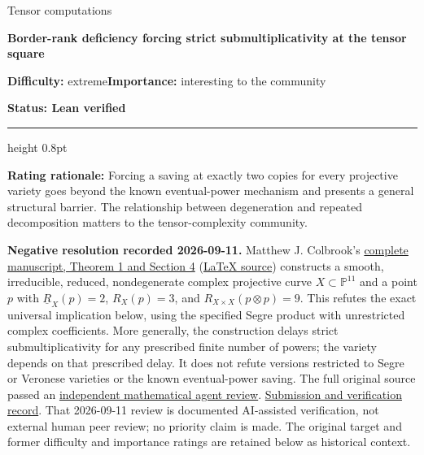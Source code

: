 \documentclass[11pt,a4paper]{article}
\begin{document}
{\sffamily\small\color{muted}Tensor computations\par}
\vspace{3pt}
{\raggedright{}\sffamily\bfseries\fontsize{21}{24}\selectfont\color{ink}Border-rank
deficiency forcing strict submultiplicativity at the tensor square\par}
\vspace{7pt}
{\sffamily\small\textbf{Difficulty:} extreme\quad\textbf{Importance:} interesting
to the community\par}
{\sffamily\small\bfseries\color{accent}Status: Lean verified\par}
\vspace{4pt}
{\color{accent}\hrule height 0.8pt}
\vspace{6pt}
\textbf{Rating rationale:} Forcing a saving at exactly two copies for
every projective variety goes beyond the known eventual-power mechanism
and presents a general structural barrier. The relationship between
degeneration and repeated decomposition matters to the tensor-complexity
community.

\textbf{Negative resolution recorded 2026-09-11.} Matthew J. Colbrook's
\href{https://github.com/ajt60gaibb/OpenProblemsInNLA/blob/main/references/colbrook-tensor-metrics-rank-2026-09-11/manuscripts/tr27_solution.pdf}{complete
manuscript, Theorem 1 and Section 4}
(\href{https://github.com/ajt60gaibb/OpenProblemsInNLA/blob/main/references/colbrook-tensor-metrics-rank-2026-09-11/manuscripts/tr27_solution.tex}{LaTeX
source}) constructs a smooth, irreducible, reduced, nondegenerate
complex projective curve \(X\subset\mathbb P^{11}\) and a point \(p\)
with \(\underline R_X(p)=2\), \(R_X(p)=3\), and
\(R_{X\times X}(p\otimes p)=9\). This refutes the exact universal
implication below, using the specified Segre product with unrestricted
complex coefficients. More generally, the construction delays strict
submultiplicativity for any prescribed finite number of powers; the
variety depends on that prescribed delay. It does not refute versions
restricted to Segre or Veronese varieties or the known eventual-power
saving. The full original source passed an
\href{https://github.com/ajt60gaibb/OpenProblemsInNLA/blob/main/references/colbrook-tensor-metrics-rank-2026-09-11/verification/reviews/TR-27-review.md}{independent
mathematical agent review}.
\href{https://github.com/ajt60gaibb/OpenProblemsInNLA/blob/main/references/colbrook-tensor-metrics-rank-2026-09-11/README.md}{Submission
and verification record}. That 2026-09-11 review is documented
AI-assisted verification, not external human peer review; no priority
claim is made. The original target and former difficulty and importance
ratings are retained below as historical context.
\end{document}
